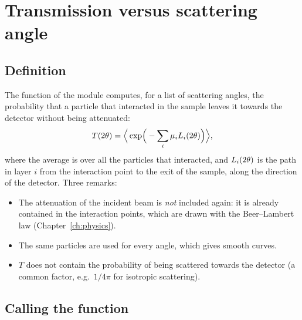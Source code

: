 \chapter{Transmission versus scattering angle}
\label{ch:transmission}

\section{Definition}

The function  of the module  computes, for a list of scattering angles,
the probability that a particle that interacted in the sample leaves it towards the detector without being attenuated:
\begin{equation}
  T(2\theta)=\Big\langle \exp\!\Big(-\sum_i\mu_iL_i(2\theta)\Big)\Big\rangle,
\end{equation}
where the average is over all the particles that interacted, and $L_i(2\theta)$ is the path in layer $i$ from the interaction point to
the exit of the sample, along the direction of the detector. Three remarks:
\begin{itemize}
  \item The attenuation of the incident beam is \emph{not} included again: it is already contained in the interaction points, which are
        drawn with the Beer--Lambert law (Chapter~\ref{ch:physics}).
  \item The same particles are used for every angle, which gives smooth curves.
  \item $T$ does not contain the probability of being scattered towards the detector (a common factor, e.g.\ $1/4\pi$ for
        isotropic scattering).
\end{itemize}

\section{Calling the function}

